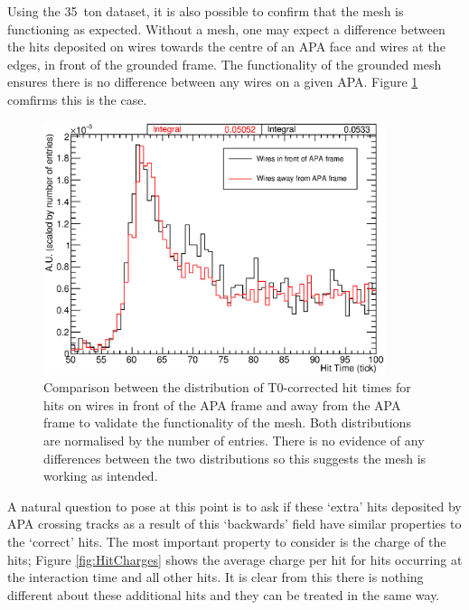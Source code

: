 Using the 35~ton dataset, it is also possible to confirm that the mesh is functioning as expected.  Without a mesh, one may expect a difference between the hits deposited on wires towards the centre of an APA face and wires at the edges, in front of the grounded frame.  The functionality of the grounded mesh ensures there is no difference between any wires on a given APA.  Figure \ref{fig:HitTimesFrame} comfirms this is the case.

\begin{figure}
  \centering
  \includegraphics[width=10cm]{HitTimesFrame.eps}
  \caption[Comparison between the distribution of T0-corrected hit times for hits on wires in front of the APA frame and away from the APA frame to validate the functionality of the mesh.]{Comparison between the distribution of T0-corrected hit times for hits on wires in front of the APA frame and away from the APA frame to validate the functionality of the mesh.  Both distributions are normalised by the number of entries.  There is no evidence of any differences between the two distributions so this suggests the mesh is working as intended.}
  \label{fig:HitTimesFrame}
\end{figure}

A natural question to pose at this point is to ask if these `extra' hits deposited by APA crossing tracks as a result of this `backwards' field have similar properties to the `correct' hits.  The most important property to consider is the charge of the hits; Figure \ref{fig:HitCharges} shows the average charge per hit for hits occurring at the interaction time and all other hits.  It is clear from this there is nothing different about these additional hits and they can be treated in the same way.

